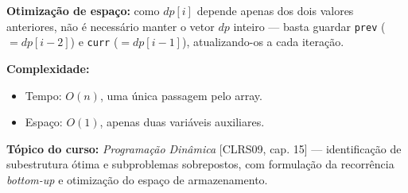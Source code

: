\textbf{Otimização de espaço:} como $dp[i]$ depende apenas dos dois valores
anteriores, não é necessário manter o vetor $dp$ inteiro --- basta guardar
\texttt{prev} ($= dp[i-2]$) e \texttt{curr} ($= dp[i-1]$), atualizando-os a
cada iteração.

\textbf{Complexidade:}
\begin{itemize}
    \item Tempo: $O(n)$, uma única passagem pelo array.
    \item Espaço: $O(1)$, apenas duas variáveis auxiliares.
\end{itemize}

\textbf{Tópico do curso:} \emph{Programação Dinâmica} [CLRS09, cap. 15] ---
identificação de subestrutura ótima e subproblemas sobrepostos, com
formulação da recorrência \emph{bottom-up} e otimização do espaço de
armazenamento.
